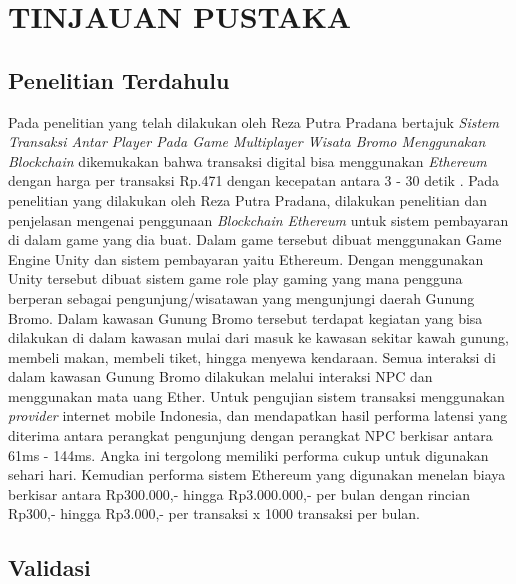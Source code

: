 \chapter{TINJAUAN PUSTAKA}
\label{chap:tinjauanpustaka}

\section{Penelitian Terdahulu}
\label{sec:penelitianterdahulu}

Pada penelitian yang telah dilakukan oleh Reza Putra Pradana bertajuk \emph{Sistem Transaksi Antar Player Pada Game Multiplayer Wisata Bromo Menggunakan Blockchain} dikemukakan bahwa transaksi digital bisa menggunakan \emph{Ethereum} dengan harga per transaksi Rp.471 dengan kecepatan antara 3 - 30 detik \cite{pradana2020}. Pada penelitian yang dilakukan oleh Reza Putra Pradana, dilakukan penelitian dan penjelasan mengenai penggunaan \emph{Blockchain Ethereum} untuk sistem pembayaran di dalam game yang dia buat. Dalam game tersebut dibuat menggunakan Game Engine Unity dan sistem pembayaran yaitu Ethereum. Dengan menggunakan Unity tersebut dibuat sistem game role play gaming yang mana pengguna berperan sebagai pengunjung/wisatawan yang mengunjungi daerah Gunung Bromo. Dalam kawasan Gunung Bromo tersebut terdapat kegiatan yang bisa dilakukan di dalam kawasan mulai dari masuk ke kawasan sekitar kawah gunung, membeli makan, membeli tiket, hingga menyewa kendaraan. Semua interaksi di dalam kawasan Gunung Bromo dilakukan melalui interaksi NPC dan menggunakan mata uang Ether. Untuk pengujian sistem transaksi menggunakan \emph{provider} internet mobile Indonesia, dan mendapatkan hasil performa latensi yang diterima antara perangkat pengunjung dengan perangkat NPC berkisar antara 61ms - 144ms. Angka ini tergolong memiliki performa cukup untuk digunakan sehari hari. Kemudian performa sistem Ethereum yang digunakan menelan biaya berkisar antara Rp300.000,- hingga Rp3.000.000,- per bulan dengan rincian Rp300,- hingga Rp3.000,- per transaksi x 1000 transaksi per bulan.

\section{Validasi}
\label{sec:validasi}

